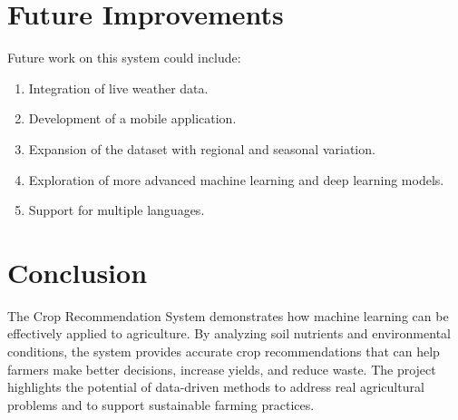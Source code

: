 \documentclass[11pt,a4paper]{article}
\begin{document}
\section{Future Improvements}

Future work on this system could include:
\begin{enumerate}
    \item Integration of live weather data.
    \item Development of a mobile application.
    \item Expansion of the dataset with regional and seasonal variation.
    \item Exploration of more advanced machine learning and deep learning models.
    \item Support for multiple languages.
\end{enumerate}

\section{Conclusion}

The Crop Recommendation System demonstrates how machine learning can be effectively applied to agriculture. By analyzing soil nutrients and environmental conditions, the system provides accurate crop recommendations that can help farmers make better decisions, increase yields, and reduce waste. The project highlights the potential of data-driven methods to address real agricultural problems and to support sustainable farming practices.
\end{document}
